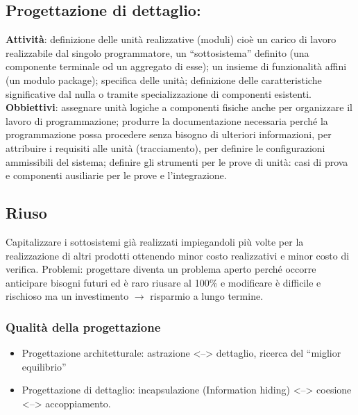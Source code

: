 \subsection{Progettazione di dettaglio:}
\textbf{Attività}: definizione delle unità realizzative (moduli) cioè un carico di lavoro realizzabile dal singolo programmatore, un ``sottosistema'' definito (una componente terminale od un aggregato di esse); un insieme di funzionalità affini (un modulo package); specifica delle unità; definizione delle caratteristiche significative dal nulla o tramite specializzazione di componenti esistenti.
\textbf{Obbiettivi}: assegnare unità logiche a componenti fisiche anche per organizzare il lavoro di programmazione; produrre la documentazione necessaria perché la programmazione possa procedere senza bisogno di ulteriori informazioni, per attribuire i requisiti alle unità (tracciamento), per definire le configurazioni ammissibili del sistema; definire gli strumenti per le prove di unità: casi di prova e componenti ausiliarie per le prove e l'integrazione.
\subsection{Riuso}
Capitalizzare i sottosistemi già realizzati impiegandoli più volte per la realizzazione di altri prodotti ottenendo minor costo realizzativi e minor costo di verifica. Problemi: progettare diventa un problema aperto perché occorre anticipare bisogni futuri ed è raro riusare al 100\% e modificare è difficile e rischioso ma un investimento $\rightarrow$ risparmio a lungo termine.

\subsubsection{Qualità della progettazione}
\begin{itemize}
\item Progettazione architetturale: astrazione <--> dettaglio, ricerca del ``miglior equilibrio''
\item Progettazione di dettaglio: incapsulazione (Information hiding) <--> coesione <--> accoppiamento.
\end{itemize}


